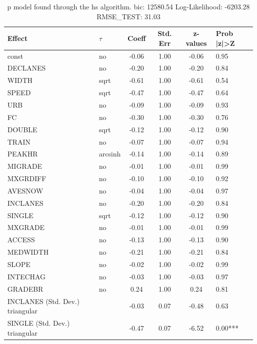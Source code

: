 \begin{table}
	\caption{p model found through the hs algorithm. bic: 12580.54 Log-Likelihood: -6203.28 RMSE_TEST: 31.03}
	\begin{center}
		\begin{tabular}{|l|l|c|c|c|l|}
			\hline
			Effect & $\tau$ & Coeff & Std. Err & z-values & Prob |z|>Z \\
			\hline
			const & no & -0.06 & 1.00 & -0.06 & 0.95 \\
			\hline
			DECLANES & no & -0.20 & 1.00 & -0.20 & 0.84 \\
			\hline
			WIDTH & sqrt & -0.61 & 1.00 & -0.61 & 0.54 \\
			\hline
			SPEED & sqrt & -0.47 & 1.00 & -0.47 & 0.64 \\
			\hline
			URB & no & -0.09 & 1.00 & -0.09 & 0.93 \\
			\hline
			FC & no & -0.30 & 1.00 & -0.30 & 0.76 \\
			\hline
			DOUBLE & sqrt & -0.12 & 1.00 & -0.12 & 0.90 \\
			\hline
			TRAIN & no & -0.07 & 1.00 & -0.07 & 0.94 \\
			\hline
			PEAKHR & arcsinh & -0.14 & 1.00 & -0.14 & 0.89 \\
			\hline
			MIGRADE & no & -0.01 & 1.00 & -0.01 & 0.99 \\
			\hline
			MXGRDIFF & no & -0.10 & 1.00 & -0.10 & 0.92 \\
			\hline
			AVESNOW & no & -0.04 & 1.00 & -0.04 & 0.97 \\
			\hline
			INCLANES & no & -0.20 & 1.00 & -0.20 & 0.84 \\
			\hline
			SINGLE & sqrt & -0.12 & 1.00 & -0.12 & 0.90 \\
			\hline
			MXGRADE & no & -0.01 & 1.00 & -0.01 & 0.99 \\
			\hline
			ACCESS & no & -0.13 & 1.00 & -0.13 & 0.90 \\
			\hline
			MEDWIDTH & no & -0.21 & 1.00 & -0.21 & 0.84 \\
			\hline
			SLOPE & no & -0.02 & 1.00 & -0.02 & 0.99 \\
			\hline
			INTECHAG & no & -0.03 & 1.00 & -0.03 & 0.97 \\
			\hline
			GRADEBR & no & 0.24 & 1.00 & 0.24 & 0.81 \\
			\hline
			INCLANES (Std. Dev.) triangular &  & -0.03 & 0.07 & -0.48 & 0.63 \\
			\hline
			SINGLE (Std. Dev.) triangular &  & -0.47 & 0.07 & -6.52 & 0.00*** \\

\end{tabular}
\end{center}
\end{table}
